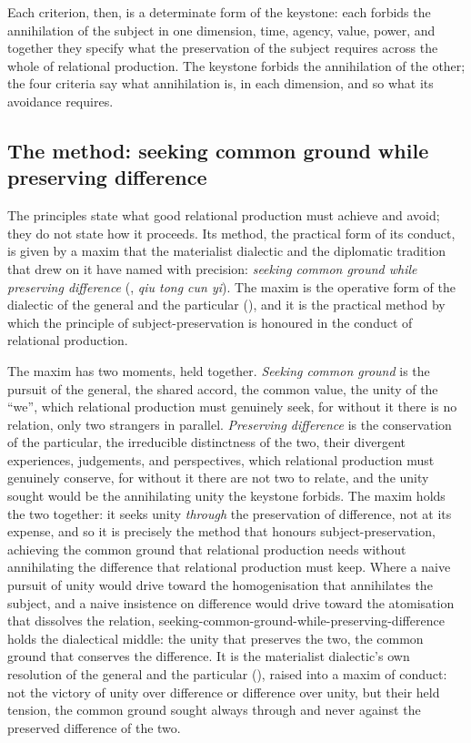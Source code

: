 Each criterion, then, is a determinate form of the keystone: each forbids the annihilation of the subject in one dimension, time, agency, value, power, and together they specify what the preservation of the subject requires across the whole of relational production. The keystone forbids the annihilation of the other; the four criteria say what annihilation is, in each dimension, and so what its avoidance requires.

\subsection{The method: seeking common ground while preserving difference}
\label{p21:sub:rp-method}

The principles state what good relational production must achieve and avoid; they do not state how it proceeds. Its method, the practical form of its conduct, is given by a maxim that the materialist dialectic and the diplomatic tradition that drew on it have named with precision: \emph{seeking common ground while preserving difference} (, \emph{qiu tong cun yi}). The maxim is the operative form of the dialectic of the general and the particular (), and it is the practical method by which the principle of subject-preservation is honoured in the conduct of relational production.

The maxim has two moments, held together. \emph{Seeking common ground} is the pursuit of the general, the shared accord, the common value, the unity of the ``we'', which relational production must genuinely seek, for without it there is no relation, only two strangers in parallel. \emph{Preserving difference} is the conservation of the particular, the irreducible distinctness of the two, their divergent experiences, judgements, and perspectives, which relational production must genuinely conserve, for without it there are not two to relate, and the unity sought would be the annihilating unity the keystone forbids. The maxim holds the two together: it seeks unity \emph{through} the preservation of difference, not at its expense, and so it is precisely the method that honours subject-preservation, achieving the common ground that relational production needs without annihilating the difference that relational production must keep. Where a naive pursuit of unity would drive toward the homogenisation that annihilates the subject, and a naive insistence on difference would drive toward the atomisation that dissolves the relation, seeking-common-ground-while-preserving-difference holds the dialectical middle: the unity that preserves the two, the common ground that conserves the difference. It is the materialist dialectic's own resolution of the general and the particular (), raised into a maxim of conduct: not the victory of unity over difference or difference over unity, but their held tension, the common ground sought always through and never against the preserved difference of the two.

